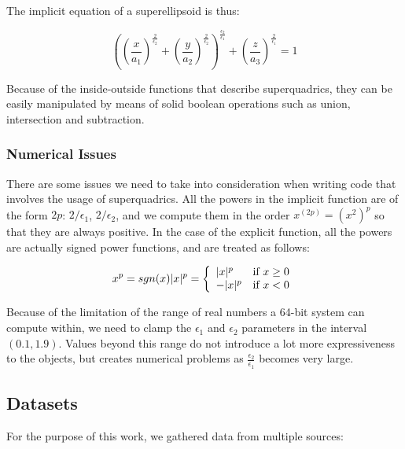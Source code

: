 \documentclass{article}
\begin{document}
The implicit equation of a superellipsoid is thus:

\begin{equation}
\left(\left(\frac{x}{a_1}\right)^{\frac{2}{\epsilon_2}} + \left(\frac{y}{a_2}\right)^{\frac{2}{\epsilon_2}}\right)^{\frac{\epsilon_2}{\epsilon_1}} + \left(\frac{z}{a_3}\right)^{\frac{2}{\epsilon_1}} =1
\end{equation}

Because of the inside-outside functions that describe superquadrics, they can be easily manipulated by means of solid boolean operations such as union, intersection and subtraction.

\subsubsection*{Numerical Issues}
There are some issues we need to take into consideration when writing code that involves the usage of superquadrics. All the powers in the implicit function are of the form $2p$: $2/\epsilon_1$, $2/\epsilon_2$, and we compute them in the order $x^{(2p)}=(x^2)^p$ so that they are always positive. In the case of the explicit function, all the powers are actually signed power functions, and are treated as follows:

\begin{equation}
x^p = sgn(x) |x|^p = \left\{
	\begin{array}{ll}
		|x|^p  & \textnormal{if } x \geq 0 \\
		-|x|^p & \textnormal{if } x < 0
	\end{array}
\right.
\end{equation}


Because of the limitation of the range of real numbers a 64-bit system can compute within, we need to clamp the $\epsilon_1$ and $\epsilon_2$ parameters in the interval $(0.1, 1.9)$. Values beyond this range do not introduce a lot more expressiveness to the objects, but creates numerical problems as $\frac{\epsilon_2}{\epsilon_1}$ becomes very large.

\subsection {Datasets}
For the purpose of this work, we gathered data from multiple sources:
\end{document}
